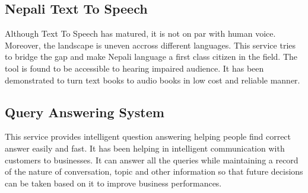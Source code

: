\documentclass[12pt,a4paper]{scrreprt}
\begin{document}
  \subsection{Nepali Text To Speech}
  Although Text To Speech has matured, it is not on par with human voice. Moreover, the landscape is uneven accross different languages.
  This service tries to bridge the gap and make Nepali language a first class citizen in the field. The tool is found to be accessible to 
  hearing impaired audience. It has been demonstrated to turn text books to audio books in low cost and reliable manner.
  
  \subsection{Query Answering System}
  This service provides intelligent question answering helping people find correct answer easily and fast.
  It has been helping in intelligent communication with customers to businesses. It can answer all the queries while maintaining a record of the nature
  of conversation, topic and other information so that future decisions can be taken
  based on it to improve business performances. 
\end{document}

